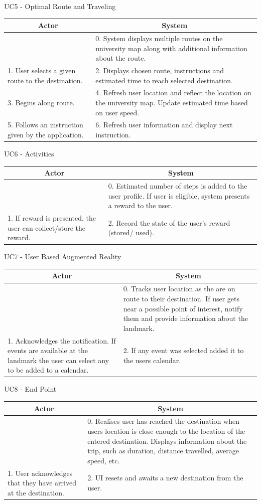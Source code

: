 \documentclass[a4paper, 12pt, one column, aas_macros]{article}
\begin{document}
\hfill \break \hfill \break \hfill \break
  UC5 - Optimal Route and Traveling \hfill \break
  \begin{tabular}{ |p{5.5cm}|p{5.5cm}| }
    \hline
    \multicolumn{1}{|c|}{Actor} & \multicolumn{1}{c|}{System} \\ \hline
     &0. System displays multiple routes on the university map along with additional information about the route.\\ \hline
     1. User selects a given route to the destination. &2. Displays chosen route, instructions and estimated time to reach selected destination.\\ \hline
     3. Begins along route.&4. Refresh user location and reflect the location on the university map. Update estimated time based on user speed.\\ \hline
     5. Follows an instruction given by the application.&6. Refresh user information and display next instruction.\\ \hline
  \end{tabular}
\hfill \break \hfill \break \hfill \break
  UC6 - Activities \hfill \break
  \begin{tabular}{ |p{5.5cm}|p{5.5cm}| }
    \hline
    \multicolumn{1}{|c|}{Actor} & \multicolumn{1}{c|}{System} \\ \hline
     &0. Estimated number of steps is added to the user profile. If user is eligible, system presents a reward to the user.\\ \hline
    1. If reward is presented, the user can collect/store the reward.&2. Record the state of the user’s reward (stored/ used).\\ \hline
  \end{tabular}
\hfill \break \hfill \break \hfill \break
\newpage
  UC7 - User Based Augmented Reality \hfill \break
  \begin{tabular}{ |p{5.5cm}|p{5.5cm}| }
    \hline
    \multicolumn{1}{|c|}{Actor} & \multicolumn{1}{c|}{System} \\ \hline
     &0. Tracks user location as the are on route to their destination. If user gets near a possible point of interest, notify them and provide information about the landmark.\\ \hline
     1. Acknowledges the notification. If events are available at the landmark the user can select any to be added to a calendar. &2. If any event was selected added it to the users calendar.\\ \hline
  \end{tabular}
\hfill \break \hfill \break \hfill \break
  UC8 - End Point \hfill \break
  \begin{tabular}{ |p{5.5cm}|p{5.5cm}| }
    \hline
    \multicolumn{1}{|c|}{Actor} & \multicolumn{1}{c|}{System} \\ \hline
     &0. Realises user has reached the destination when users location is close enough to the location of the entered destination. Displays information about the trip, such as duration, distance travelled, average speed, etc.\\ \hline
     1. User acknowledges that they have arrived at the destination.&2. UI resets and awaits a new destination from the user.\\ \hline
  \end{tabular}
\end{document}
